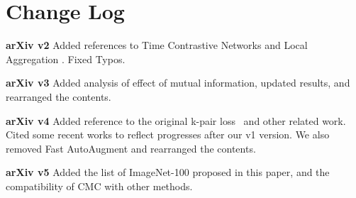 \documentclass[10pt,twocolumn,letterpaper]{article}
\newcommand{\citep}[1]{\cite{#1}}
\begin{document}
\section{Change Log}
{\bf {arXiv v2}} Added references to Time Contrastive Networks \citep{sermanet2017time} and Local Aggregation \citep{zhuang2019local}. Fixed Typos.

{\bf{arXiv v3}} Added analysis of effect of mutual information, updated results, and rearranged the contents. 

{\bf{arXiv v4}} Added reference to the original k-pair loss~\cite{sohn2016improved} and other related work. Cited some recent works to reflect progresses after our v1 version. We also removed Fast AutoAugment and rearranged the contents. 

{\bf{arXiv v5}} Added the list of ImageNet-100 proposed in this paper, and the compatibility of CMC with other methods.  
\end{document}
